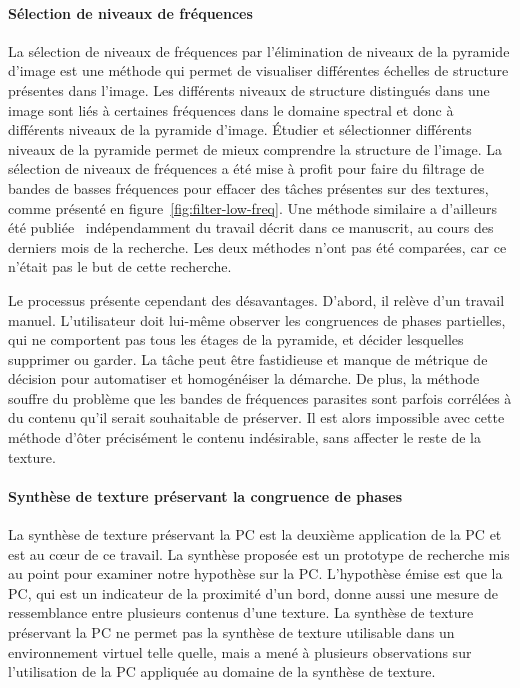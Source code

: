 \paragraph{Sélection de niveaux de fréquences}

La sélection de niveaux de fréquences par l'élimination de niveaux de la pyramide d'image est une méthode qui permet de visualiser différentes échelles de structure présentes dans l'image. Les différents niveaux de structure distingués dans une image sont liés à certaines fréquences dans le domaine spectral et donc à différents niveaux de la pyramide d'image. Étudier et sélectionner différents niveaux de la pyramide permet de mieux comprendre la structure de l'image. La sélection de niveaux de fréquences a été mise à profit pour faire du filtrage de bandes de basses fréquences pour effacer des tâches présentes sur des textures, comme présenté en figure~\ref{fig:filter-low-freq}. Une méthode similaire a d'ailleurs été publiée~\cite{zhang_pyramid_2023} indépendamment du travail décrit dans ce manuscrit, au cours des derniers mois de la recherche. Les deux méthodes n'ont pas été comparées, car ce n'était pas le but de cette recherche.

\bigskip

Le processus présente cependant des désavantages. D'abord, il relève d'un travail manuel. L'utilisateur doit lui-même observer les congruences de phases partielles, qui ne comportent pas tous les étages de la pyramide, et décider lesquelles supprimer ou garder. La tâche peut être fastidieuse et manque de métrique de décision pour automatiser et homogénéiser la démarche. De plus, la méthode souffre du problème que les bandes de fréquences parasites sont parfois corrélées à du contenu qu'il serait souhaitable de préserver. Il est alors impossible avec cette méthode d'ôter précisément le contenu indésirable, sans affecter le reste de la texture.

\paragraph{Synthèse de texture préservant la congruence de phases}
\label{par:discussion-synthesis}

La synthèse de texture préservant la PC est la deuxième application de la PC et est au cœur de ce travail. La synthèse proposée est un prototype de recherche mis au point pour examiner notre hypothèse sur la PC. L'hypothèse émise est que la PC, qui est un indicateur de la proximité d'un bord, donne aussi une mesure de ressemblance entre plusieurs contenus d'une texture. La synthèse de texture préservant la PC ne permet pas la synthèse de texture utilisable dans un environnement virtuel telle quelle, mais a mené à plusieurs observations sur l'utilisation de la PC appliquée au domaine de la synthèse de texture.

